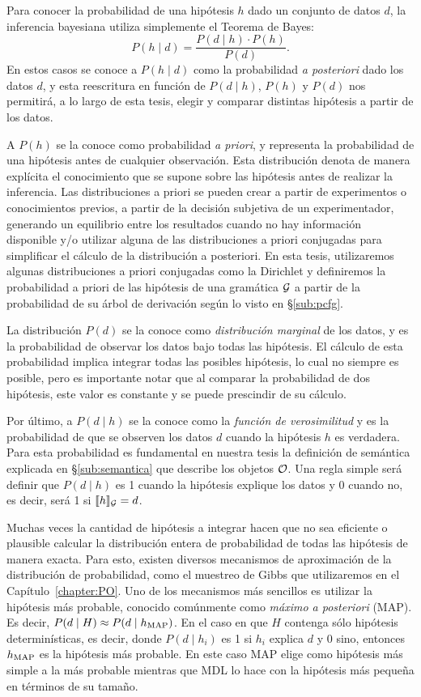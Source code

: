 Para conocer la probabilidad de una hipótesis $h$ dado un conjunto de datos $d$, la inferencia bayesiana utiliza simplemente el Teorema de Bayes:
$$
P(h\mid d) = \frac{P(d\mid h) \cdot P(h)}{P(d)}.
$$
En estos casos se conoce a $P(h\mid d)$ como la probabilidad {\em a posteriori} dado los datos $d$, y esta reescritura en función de $P(d\mid h)$, $P(h)$ y $P(d)$ nos permitirá, a lo largo de esta tesis, elegir y comparar distintas hipótesis a partir de los datos.

A $P(h)$ se la conoce como probabilidad {\em a priori}, y representa la probabilidad de una hipótesis antes de cualquier observación. Esta distribución denota de manera explícita el conocimiento que se supone sobre las hipótesis antes de realizar la inferencia. Las distribuciones a priori se pueden crear a partir de experimentos o conocimientos previos, a partir de la decisión subjetiva de un experimentador, generando un equilibrio entre los resultados cuando no hay información disponible y/o utilizar alguna de las distribuciones a priori conjugadas para simplificar el cálculo de la distribución a posteriori. En esta tesis, utilizaremos algunas distribuciones a priori conjugadas como la Dirichlet y definiremos la probabilidad a priori de las hipótesis de una gramática $\gram$ a partir de la probabilidad de su árbol de derivación según lo visto en \S\ref{sub:pcfg}.

La distribución $P(d)$ se la conoce como {\em distribución marginal} de los datos, y es la probabilidad de observar los datos bajo todas las hipótesis. El cálculo de esta probabilidad implica integrar todas las posibles hipótesis, lo cual no siempre es posible, pero es importante notar que al comparar la probabilidad de dos hipótesis, este valor es constante y se puede prescindir de su cálculo. 

Por último, a $P(d\mid h)$ se la conoce como la {\em función de verosimilitud} y es la probabilidad de que se observen los datos $d$ cuando la hipótesis $h$ es verdadera. Para esta probabilidad es fundamental en nuestra tesis la definición de semántica explicada en \S\ref{sub:semantica} que describe los objetos $\+O$. Una regla simple será definir que $P(d\mid h)$ es 1 cuando la hipótesis explique los datos y 0 cuando no, es decir, será 1 si $\sem{h}_\gram = d$.

Muchas veces la cantidad de hipótesis a integrar hacen que no sea eficiente o plausible calcular la distribución entera de probabilidad de todas las hipótesis de manera exacta. Para esto, existen diversos mecanismos de aproximación de la distribución de probabilidad, como el muestreo de Gibbs que utilizaremos en el Capítulo~\ref{chapter:PO}. Uno de los mecanismos más sencillos es utilizar la hipótesis más probable, conocido comúnmente como {\em máximo a posteriori} (MAP). Es decir, $P(d\mid H) \approx P(d\mid h_{\rm MAP})$. En el caso en que $H$ contenga sólo hipótesis determinísticas, es decir, donde $P(d\mid h_i)$ es 1 si $h_i$ explica $d$ y $0$ sino, entonces $h_{\rm MAP}$ es la hipótesis más probable. En este caso MAP elige como hipótesis más simple a la más probable mientras que MDL lo hace con la hipótesis más pequeña en términos de su tamaño.


